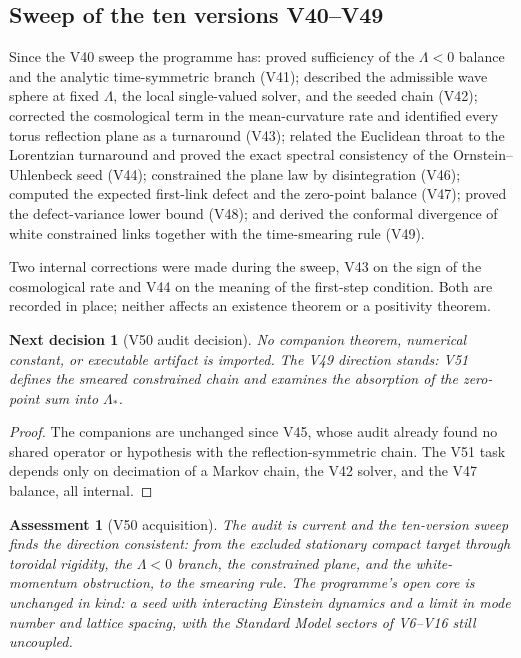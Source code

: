 \documentclass[11pt]{article}
\newtheorem{decision}[theorem]{Next decision}
\newtheorem{assessment}[theorem]{Assessment}
\theoremstyle{remark}
\begin{document}
\subsection{Sweep of the ten versions V40--V49}

Since the V40 sweep the programme has: proved sufficiency of the
\(\Lambda<0\) balance and the analytic time-symmetric branch (V41);
described the admissible wave sphere at fixed \(\Lambda\), the local
single-valued solver, and the seeded chain (V42); corrected the
cosmological term in the mean-curvature rate and identified every torus
reflection plane as a turnaround (V43); related the Euclidean throat to
the Lorentzian turnaround and proved the exact spectral consistency of
the Ornstein--Uhlenbeck seed (V44); constrained the plane law by
disintegration (V46); computed the expected first-link defect and the
zero-point balance (V47); proved the defect-variance lower bound
(V48); and derived the conformal divergence of white constrained links
together with the time-smearing rule (V49).

Two internal corrections were made during the sweep, V43 on the sign
of the cosmological rate and V44 on the meaning of the first-step
condition.  Both are recorded in place; neither affects an existence
theorem or a positivity theorem.

\begin{decision}[V50 audit decision]
\label{dec:v19v50-audit}
No companion theorem, numerical constant, or executable artifact is
imported.  The V49 direction stands: V51 defines the smeared
constrained chain and examines the absorption of the zero-point sum
into \(\Lambda_*\).
\end{decision}

\begin{proof}
The companions are unchanged since V45, whose audit already found no
shared operator or hypothesis with the reflection-symmetric chain.  The
V51 task depends only on decimation of a Markov chain, the V42 solver,
and the V47 balance, all internal.
\end{proof}

\begin{assessment}[V50 acquisition]
\label{ass:v19v50}
The audit is current and the ten-version sweep finds the direction
consistent: from the excluded stationary compact target through
toroidal rigidity, the \(\Lambda<0\) branch, the constrained plane, and
the white-momentum obstruction, to the smearing rule.  The programme's
open core is unchanged in kind: a seed with interacting Einstein
dynamics and a limit in mode number and lattice spacing, with the
Standard Model sectors of V6--V16 still uncoupled.
\end{assessment}
\end{document}

